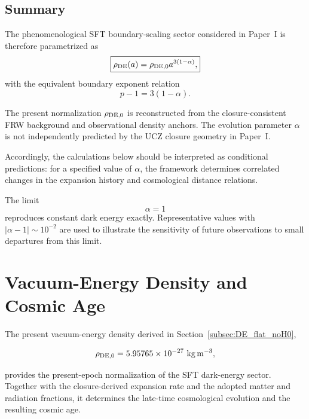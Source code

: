 \documentclass[12pt]{article}
\begin{document}
\subsection{Summary}

The phenomenological SFT boundary-scaling sector considered in
Paper~I is therefore parametrized as
\begin{equation}
\boxed{
\rho_{\rm DE}(a)
=
\rho_{{\rm DE},0}a^{3(1-\alpha)},
}
\end{equation}
with the equivalent boundary exponent relation
\begin{equation}
\boxed{
p-1=3(1-\alpha).
}
\end{equation}

The present normalization $\rho_{{\rm DE},0}$ is reconstructed from
the closure-consistent FRW background and observational density
anchors. The evolution parameter $\alpha$ is not independently
predicted by the UCZ closure geometry in Paper~I.

Accordingly, the calculations below should be interpreted as
conditional predictions:
for a specified value of $\alpha$, the framework determines correlated
changes in the expansion history and cosmological distance relations.

The limit
\[
\alpha=1
\]
reproduces constant dark energy exactly. Representative values with
$|\alpha-1|\sim10^{-2}$ are used to illustrate the sensitivity of
future observations to small departures from this limit.



\section{Vacuum-Energy Density and Cosmic Age}
\label{sec:vacuum_age}

The present vacuum-energy density derived in
Section~\ref{subsec:DE_flat_noH0},

\begin{equation}
\rho_{\rm DE,0}
=
5.95765\times10^{-27}
\ \mathrm{kg\,m^{-3}},
\end{equation}

provides the present-epoch normalization of the SFT dark-energy sector.
Together with the closure-derived expansion rate and the adopted matter
and radiation fractions, it determines the late-time cosmological
evolution and the resulting cosmic age.
\end{document}

